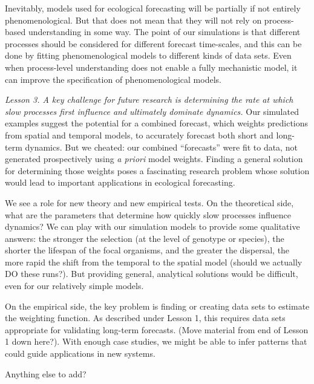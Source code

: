 \documentclass[11pt]{article}
\begin{document}
Inevitably, models used for ecological forecasting will be partially if not entirely phenomenological. But that does not mean that they will not rely on process-based
understanding in some way. The point of our simulations is that different processes should be considered for different forecast time-scales, and this can be done 
by fitting phenomenological models to different kinds of data sets. Even when process-level understanding does not enable a fully mechanistic model, it can
improve the specification of phenomenological models.
 
\emph{Lesson 3. A key challenge for future research is determining the rate at which slow processes first influence and ultimately dominate dynamics.}
Our simulated examples suggest the potential for a combined forecast, which weights predictions from spatial and temporal models, to 
accurately forecast both short and long-term dynamics. But we cheated: our combined ``forecasts'' were fit to data, not generated prospectively
using \emph{a priori} model weights. Finding a general solution for determining those weights poses a fascinating research problem whose 
solution would lead to important applications in ecological forecasting. 

We see a role for new theory and new empirical tests. On the theoretical side, what are the parameters that determine how quickly slow processes
influence dynamics? We can play with our simulation models to provide some qualitative answers: the stronger the selection (at the level of genotype 
or species), the shorter the lifespan of the focal organisms, and the greater the dispersal, the more rapid the shift from the temporal to the spatial model
(should we actually DO these runs?). But providing general, analytical solutions would be difficult, even for our relatively simple models. 

On the empirical side, the key problem is finding or creating data sets to estimate the weighting function. As described under Lesson 1,
this requires data sets appropriate for validating long-term forecasts.
(Move material from end of  Lesson 1 down here?). With enough case studies, we might be able to infer patterns
that could guide applications in new systems.

Anything else to add?

\newpage
\renewcommand{\refname}{Literature cited}




\end{document}
